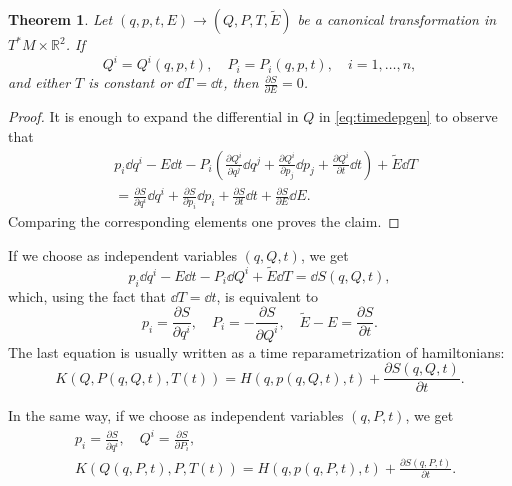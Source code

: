 \documentclass[english,fontsize=11pt,paper=b5]{scrbook}
\newtheorem{theorem}{Theorem}[chapter]
\theoremstyle{definition}
\begin{document}
    \begin{theorem}\label{thm:Ham0}
      Let $(q,p,t,E) \to (Q,P,T,\widetilde E)$ be a canonical transformation in $T^*M\times \mathbb{R}^2$. If
      \begin{equation}
        Q^i = Q^i(q,p,t), \quad P_i = P_i(q,p,t), \quad i=1,\ldots,n,
      \end{equation}
      and either $T$ is constant or $\dd T = \dd t$, then $\frac{\partial S}{\partial E} = 0$.
    \end{theorem}
    \begin{proof}
      It is enough to expand the differential in $Q$ in \eqref{eq:timedepgen} to observe that
      \begin{align}
     & p_i \dd q^i -E \dd t - P_i \left(
       \frac{\partial Q^i}{\partial q^j}\dd q^j
       +\frac{\partial Q^i}{\partial p_j}\dd p_j
       +\frac{\partial Q^i}{\partial t}\dd t
     \right) + \widetilde E \dd T        \\
     & =
     \frac{\partial S}{\partial q^i}\dd q^i
     +\frac{\partial S}{\partial p_i}\dd p_i
     +\frac{\partial S}{\partial t}\dd t
     +\frac{\partial S}{\partial E}\dd E.
      \end{align}
      Comparing the corresponding elements one proves the claim.
    \end{proof}

    If we choose as independent variables $(q,Q,t)$, we get
    \begin{equation}
      p_i \dd q^i - E \dd t -P_i \dd Q^i + \widetilde E\dd T = \dd S(q,Q,t),
    \end{equation}
    which, using the fact that $\dd T = \dd t$, is equivalent to
    \begin{equation}\label{eq:motionpPEtE}
      p_i = \frac{\partial S}{\partial q^i}, \quad
      P_i = - \frac{\partial S}{\partial Q^i}, \quad
      \widetilde E - E = \frac{\partial S}{\partial t}.
    \end{equation}
    The last equation is usually written as a time reparametrization of hamiltonians:
    \begin{equation}\label{eq:time-reparamqQt}
      K(Q, P(q,Q,t), T(t)) = H(q,p(q,Q,t),t) + \frac{\partial S(q,Q,t)}{\partial t}.
    \end{equation}

    In the same way, if we choose as independent variables $(q,P,t)$, we get
    \begin{align}
   & p_i = \frac{\partial S}{\partial q^i}, \quad Q^i = \frac{\partial S}{\partial P_i},                       \\
   & K(Q(q,P,t), P, T(t)) = H(q, p(q,P,t),t) + \frac{\partial S(q,P,t)}{\partial t}.\label{eq:time-reparamqPt}
    \end{align}
\end{document}
